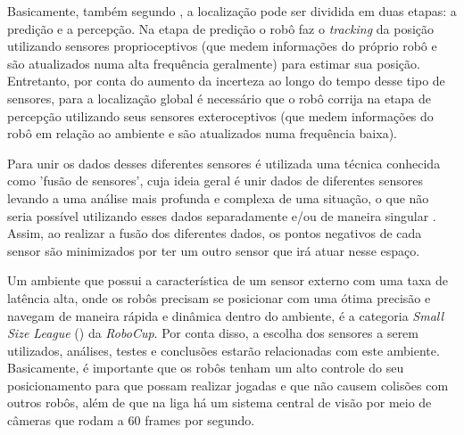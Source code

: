\documentclass[acronym, symbols, table]{fei}
\begin{document}
	Basicamente, também segundo \textcite{PANIGRAHI20226019}, a localização pode ser dividida em duas etapas: a predição e a percepção. Na etapa de predição o robô faz o \textit{tracking} da posição utilizando sensores proprioceptivos (que medem informações do próprio robô e são atualizados numa alta frequência geralmente) para estimar sua posição. Entretanto, por conta do aumento da incerteza ao longo do tempo desse tipo de sensores, para a localização global é necessário que o robô corrija na etapa de percepção utilizando seus sensores exteroceptivos (que medem informações do robô em relação ao ambiente e são atualizados numa frequência baixa).
	
	Para unir os dados desses diferentes sensores é utilizada uma técnica conhecida como 'fusão de sensores', cuja ideia geral é unir dados de diferentes sensores levando a uma análise mais profunda e complexa de uma situação, o que não seria possível utilizando esses dados separadamente e/ou de maneira singular \cite{s16101569}. Assim, ao realizar a fusão dos diferentes dados, os pontos negativos de cada sensor são minimizados por ter um outro sensor que irá atuar nesse espaço.
	
	Um ambiente que possui a característica de um sensor externo com uma taxa de latência alta, onde os robôs precisam se posicionar com uma ótima precisão e navegam de maneira rápida e dinâmica dentro do ambiente, é a categoria \textit{Small Size League} () da \textit{RoboCup}. Por conta disso, a escolha dos sensores a serem utilizados, análises, testes e conclusões estarão relacionadas com este ambiente. Basicamente, é importante que os robôs tenham um alto controle do seu posicionamento para que possam realizar jogadas e que não causem colisões com outros robôs, além de que na liga há um sistema central de visão por meio de câmeras que rodam a 60 frames por segundo.

%	
	
\end{document}
